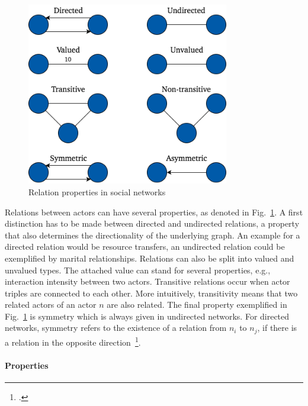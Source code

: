 \begin{figure}[h]
  \includegraphics[height=8cm]{img/relation_properties}
  \caption{Relation properties in social networks}
\label{fig:tie_properties}
\end{figure}

Relations between actors can have several properties, as denoted in Fig.~\ref{fig:tie_properties}.
A first distinction has to be made between directed and undirected relations,
a property that also determines the directionality of the underlying graph.
An example for a directed relation would be resource transfers, an undirected
relation could be exemplified by marital relationships.
Relations can also be split into valued and unvalued types.
The attached value can stand for several properties, e.g., interaction intensity
between two actors.
Transitive relations occur when actor triples are connected to each other.
More intuitively, transitivity means that two related actors of an actor $n$ are
also related.
The final property exemplified in Fig.~\ref{fig:tie_properties} is symmetry which
is always given in undirected networks.
For directed networks, symmetry refers to the existence of a relation from
$n_i$ to $n_j$, if there is a relation in the opposite direction~\footcite{Wasserman1994}.

\paragraph{Properties}
\label{sub:sn_properties}

